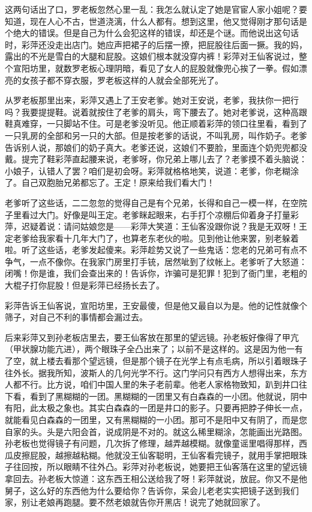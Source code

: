 这两句话出了口，罗老板忽然心里一乱：我怎么就认定了她是官宦人家小姐呢？要知道，现在人心不古，世道浇漓，什么人都有。想到这里，他又觉得刚才那句话是个绝大的错误。但是自己为什么会犯这样的错误，却还是个谜。而他说出这句话时，彩萍还没走出店门。她应声把裙子的后摆一撩，把屁股往后面一撅。我的妈，露出的不光是雪白的大腿和屁股。这娘们根本就没穿内裤！彩萍对王仙客说过，整个宣阳坊里，就数罗老板心理阴暗，看见了女人的屁股就像兜心挨了一拳。假如漂亮的女孩子都不穿衣服，罗老板这样的人就会全部死光了。 

从罗老板那里出来，彩萍又遇上了王安老爹。她对王安说，老爹，我扶你一把行吗？我要提提鞋。说着就按住了老爹的肩头，弯下腰去了。她对老爹说，这种高跟鞋真难穿，一只脚站不住。可是老爹没听见。他正顺着彩萍的领口往里看，看到了一只乳房的全部和另一只的大部。但是按老爹的话说，不叫乳房，叫作奶子。老爹告诉别人说，那娘们的奶子真大。老爹还说，这娘们不要脸，里面连个奶兜兜都没戴。提完了鞋彩萍直起腰来说，老爹呀，你兄弟上哪儿去了？老爹摸不着头脑说：小娘子，认错人了罢？咱们是初会呀。彩萍就格格地笑，说道：老爹，你老糊涂了。自己双胞胎兄弟都忘了。王定！原来给我们看大门！ 

老爹听了这些话，二二忽忽的觉得自己是有个兄弟，长得和自己一模一样，在空院子里看过大门。好像是叫王定。老爹眯起眼来，右手打个凉棚后仰着身子打量彩萍，迟疑着说：请问姑娘您是——彩萍大笑道：王仙客没跟你说？我是无双呀！王定老爹给我家看十几年大门了，也算老东老伙的啦。见到他让他来罢，别老躲着啦。听了这些话，老爹发起傻来。彩萍趁势又说了一些鬼话：您老的兄弟可有点不争气，一点不像你。在我家门房里打手铳，居然呲到了纹帐上。老爹听了大怒道：闭嘴！你是谁，我们会查出来的！告诉你，诈骗可是犯罪！犯到了衙门里，老粗的大棍子打你屁股！但是彩萍已经扬长去了。 

彩萍告诉王仙客说，宣阳坊里，王安最傻，但是他又最自以为是。他的记性就像个筛子，对自己不利的事情都会漏过去。 

后来彩萍又到孙老板店里去，要王仙客放在那里的望远镜。孙老板好像得了甲亢（甲状腺功能亢进），两个眼珠子全凸出来了；以前不是这样的。这是因为他一有了空，就上楼去看那个望远镜，但是那个镜子在光学上有点毛病，所以引着眼珠子往外长。据我所知，波斯人的几何光学不行。这门学问只有西方人想得出来，东方人都不行。比方说，咱们中国人里的朱子老前辈。他老人家格物致知，趴到井口往下看，看到了黑糊糊的一团。黑糊糊的一团里又有白森森的一小团。他就说，阴中有阳，此太极之象也。其实白森森的一团是井口的影子。只要再把脖子伸长一点，就能看见白森森的一团里，又有黑糊糊的一小团。那可不是阳中又有阴了，而是您自家的头。头是六阳会首，说成阴是不对的。就这么稀里糊涂，怎能画出光路图。孙老板也觉得镜子有问题，几次拆了修理，越弄越模糊。就像童谣里唱得那样，西瓜皮擦屁股，越擦越粘糊。他就没王仙客聪明，王仙客看完镜子，就用手掌把眼珠子往回按，所以眼睛不往外凸。彩萍对孙老板说，她要把王仙客落在这里的望远镜拿回去。孙老板大惊道：这东西王相公送给我了呀！彩萍就说，放屁。你又不是他舅子，这么好的东西他为什么要给你？告诉你，呆会儿老老实实把镜子送到我们家，别让老娘再跑腿。要不然老娘就告你开黑店！说完了她就回家了。 

